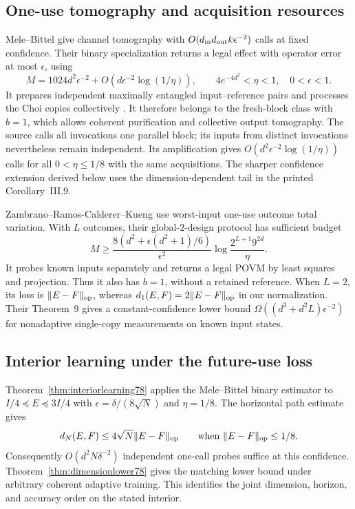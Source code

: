 \subsection{One-use tomography and acquisition resources}
Mele--Bittel \cite[Theorem~I.1]{MB67} give channel tomography with
$O(d_{\rm in}d_{\rm out}k\epsilon^{-2})$ calls at fixed confidence.
Their binary specialization
\cite[Lemmas~III.7--III.8 and Corollary~III.9]{MB67} returns a
legal effect with operator error at most $\epsilon$, using
\[
 M=1024d^2\epsilon^{-2}
   +O(d\epsilon^{-2}\log(1/\eta)),
 \qquad 4e^{-4d^2}<\eta<1,\quad 0<\epsilon<1.
\]
It prepares independent maximally entangled input--reference pairs
and processes the Choi copies collectively
\cite[Algorithm~I.2, Figure~1 and Section~III.2]{MB67}.  It
therefore belongs to the fresh-block class with $b=1$, which allows
coherent purification and collective output tomography.  The
source calls all invocations one parallel block; its inputs from
distinct invocations nevertheless remain independent.  Its
amplification \cite[Remark~III.4, equation~(165)]{MB67} gives
$O(d^2\epsilon^{-2}\log(1/\eta))$ calls for all
$0<\eta\le1/8$ with the same acquisitions.  The sharper confidence
extension derived below uses the dimension-dependent tail in the
printed Corollary~III.9.

Zambrano--Ramos-Calderer--Kueng
\cite[Definition~1 and Theorem~2]{ZRK76} use worst-input one-use
outcome total variation.  With $L$ outcomes, their global-$2$-design
protocol has sufficient budget
\[
 M\ge \frac{8(d^2+\epsilon(d^2+1)/6)}{\epsilon^2}
       \log\frac{2^{L+1}9^{2d}}{\eta}.
\]
It probes known inputs separately and returns a legal POVM by least
squares and projection.  Thus it also has $b=1$, without a retained
reference.  When $L=2$, its loss is $\|E-F\|_{\rm op}$, whereas
$d_1(E,F)=2\|E-F\|_{\rm op}$ in our normalization.  Their
Theorem~9 gives a constant-confidence lower bound
$\Omega((d^3+d^2L)\epsilon^{-2})$ for nonadaptive single-copy
measurements on known input states.

\subsection{Interior learning under the future-use loss}
Theorem~\ref{thm:interiorlearning78} applies the Mele--Bittel
binary estimator to $I/4\preceq E\preceq3I/4$ with
$\epsilon=\delta/(8\sqrt N)$ and $\eta=1/8$.  The horizontal
path estimate gives
\[
 d_N(E,F)\le4\sqrt N\|E-F\|_{\rm op}
 \qquad\text{when }\|E-F\|_{\rm op}\le1/8.
\]
Consequently $O(d^2N\delta^{-2})$ independent one-call probes
suffice at this confidence.  Theorem~\ref{thm:dimensionlower78}
gives the matching lower bound under arbitrary coherent adaptive
training.  This identifies the joint dimension, horizon, and
accuracy order on the stated interior.

